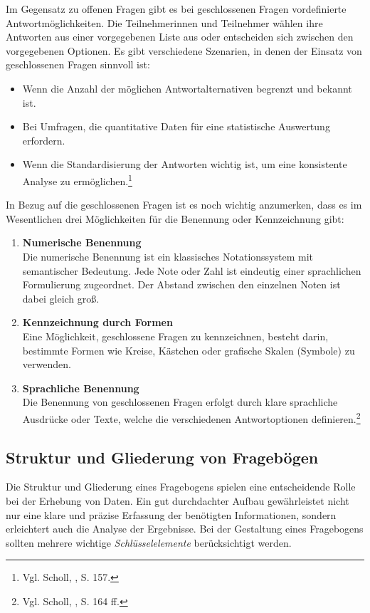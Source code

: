 Im Gegensatz zu offenen Fragen gibt es bei geschlossenen Fragen vordefinierte Antwortmöglichkeiten. Die Teilnehmerinnen
und Teilnehmer wählen ihre Antworten aus einer vorgegebenen Liste aus oder entscheiden sich zwischen den vorgegebenen
Optionen. Es gibt verschiedene Szenarien, in denen der Einsatz von geschlossenen Fragen sinnvoll ist:

\begin{itemize}
    \item Wenn die Anzahl der möglichen Antwortalternativen begrenzt und bekannt ist.
    \item Bei Umfragen, die quantitative Daten für eine statistische Auswertung erfordern.
    \item Wenn die Standardisierung der Antworten wichtig ist, um eine konsistente Analyse zu ermöglichen.\footnote{Vgl. Scholl, \cite{Die Befragung}, S. 157.}
\end{itemize}

In Bezug auf die geschlossenen Fragen ist es noch wichtig anzumerken, dass es im Wesentlichen drei Möglichkeiten für die
Benennung oder Kennzeichnung gibt:
\begin{enumerate}
    \item \textbf{Numerische Benennung}\\
    Die numerische Benennung ist ein klassisches Notationssystem mit semantischer Bedeutung. Jede Note oder Zahl ist
    eindeutig einer sprachlichen Formulierung zugeordnet. Der Abstand zwischen den einzelnen Noten ist dabei gleich groß.
    \item \textbf{Kennzeichnung durch Formen}\\
    Eine Möglichkeit, geschlossene Fragen zu kennzeichnen, besteht darin, bestimmte Formen wie Kreise, Kästchen oder
    grafische Skalen (Symbole) zu verwenden.
    \item \textbf{Sprachliche Benennung}\\
    Die Benennung von geschlossenen Fragen erfolgt durch klare sprachliche Ausdrücke oder Texte, welche die verschiedenen
    Antwortoptionen definieren.\footnote{Vgl. Scholl, \cite{Die Befragung}, S. 164 ff.}
\end{enumerate}

\subsection{Struktur und Gliederung von Fragebögen}
Die Struktur und Gliederung eines Fragebogens spielen eine entscheidende Rolle bei der Erhebung von Daten. Ein gut
durchdachter Aufbau gewährleistet nicht nur eine klare und präzise Erfassung der benötigten Informationen, sondern
erleichtert auch die Analyse der Ergebnisse. Bei der Gestaltung eines Fragebogens sollten mehrere wichtige \textit{Schlüsselelemente}
berücksichtigt werden.

